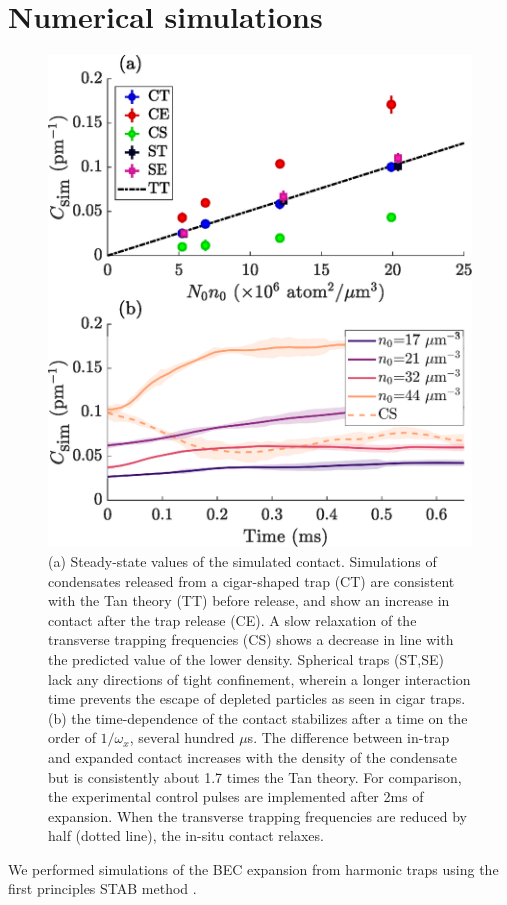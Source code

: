 \section{Numerical simulations}
\label{STAB}
	\begin{figure}[b]
	        \includegraphics[width=\columnwidth]{fig/depletion/sim_results}
	        \caption{(a) Steady-state values of the simulated contact.
	Simulations of condensates released from a cigar-shaped trap (CT) are consistent with the Tan theory (TT) before release, and show an increase in contact after the trap release (CE).
	A slow relaxation of the transverse trapping frequencies (CS) shows a decrease in line with the predicted value of the lower density.
	Spherical traps (ST,SE) lack any directions of tight confinement, wherein a longer interaction time prevents the escape of depleted particles as seen in cigar traps.
	(b) the time-dependence of the contact stabilizes after a time on the order of $1/\omega_x$, several hundred $\mu$s.
	The difference between in-trap and expanded contact increases with the density of the condensate but is consistently about 1.7 times the Tan theory.
	For comparison, the experimental control pulses are implemented after 2ms of expansion.
	When the transverse trapping frequencies are reduced by half (dotted line), the in-situ contact relaxes.}
	        \label{fig:sim_fig}
	\end{figure}
	We performed simulations of the BEC expansion from harmonic traps using the first principles STAB method \cite{Deuar11,Kheruntsyan12}.
	
